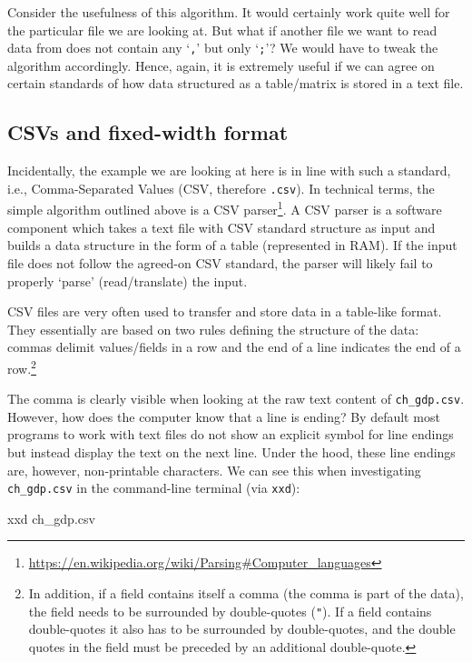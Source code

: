 \documentclass[
  12pt,
]{style/krantz}
\newenvironment{Shaded}{\begin{snugshade}}{\end{snugshade}}
\newcommand{\ExtensionTok}[1]{#1}
\newcommand{\NormalTok}[1]{#1}
\renewcommand{\href}[2]{#2\footnote{\url{#1}}}
\begin{document}
Consider the usefulness of this algorithm. It would certainly work quite well for the particular file we are looking at. But what if another file we want to read data from does not contain any `\texttt{,}' but only `\texttt{;}'? We would have to tweak the algorithm accordingly. Hence, again, it is extremely useful if we can agree on certain standards of how data structured as a table/matrix is stored in a text file.

\hypertarget{csvs-and-fixed-width-format}{%
\subsection{CSVs and fixed-width format}\label{csvs-and-fixed-width-format}}

Incidentally, the example we are looking at here is in line with such a standard, i.e., Comma-Separated Values (CSV, therefore \texttt{.csv}). In technical terms, the simple algorithm outlined above is a CSV \href{https://en.wikipedia.org/wiki/Parsing\#Computer_languages}{parser}. A CSV parser is a software component which takes a text file with CSV standard structure as input and builds a data structure in the form of a table (represented in RAM). If the input file does not follow the agreed-on CSV standard, the parser will likely fail to properly `parse' (read/translate) the input.

CSV files are very often used to transfer and store data in a table-like format. They essentially are based on two rules defining the structure of the data: commas delimit values/fields in a row and the end of a line indicates the end of a row.\footnote{In addition, if a field contains itself a comma (the comma is part of the data), the field needs to be surrounded by double-quotes (\texttt{"}). If a field contains double-quotes it also has to be surrounded by double-quotes, and the double quotes in the field must be preceded by an additional double-quote.}

The comma is clearly visible when looking at the raw text content of \texttt{ch\_gdp.csv}. However, how does the computer know that a line is ending? By default most programs to work with text files do not show an explicit symbol for line endings but instead display the text on the next line. Under the hood, these line endings are, however, non-printable characters. We can see this when investigating \texttt{ch\_gdp.csv} in the command-line terminal (via \texttt{xxd}):

\begin{Shaded}
\begin{Highlighting}[]
\ExtensionTok{xxd}\NormalTok{ ch\_gdp.csv}
\end{Highlighting}
\end{Shaded}
\end{document}
